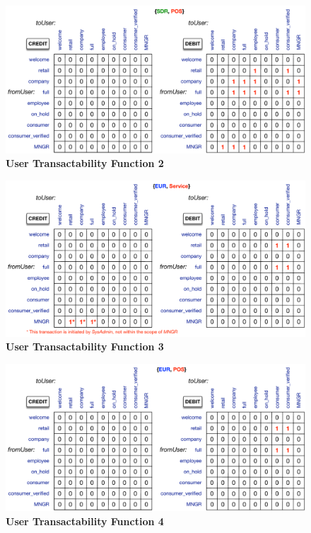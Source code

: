 \begin{figure}[H]
\vspace{-0.3cm}
\centering
\includegraphics[width=16cm]{Figures/UTF2}
\caption{\small\textbf{User Transactability Function 2}}
\label{fig:UTF2}
\vspace{-1cm}
\end{figure}

\begin{figure}[H]
\vspace{-0.3cm}
\centering
\includegraphics[width=16cm]{Figures/UTF3}
\caption{\small\textbf{User Transactability Function 3}}
\label{fig:UTF3}
\vspace{-1cm}
\end{figure}

\begin{figure}[H]
\vspace{-0.3cm}
\centering
\includegraphics[width=16cm]{Figures/UTF4}
\caption{\small\textbf{User Transactability Function 4}}
\label{fig:UTF4}
\end{figure}

